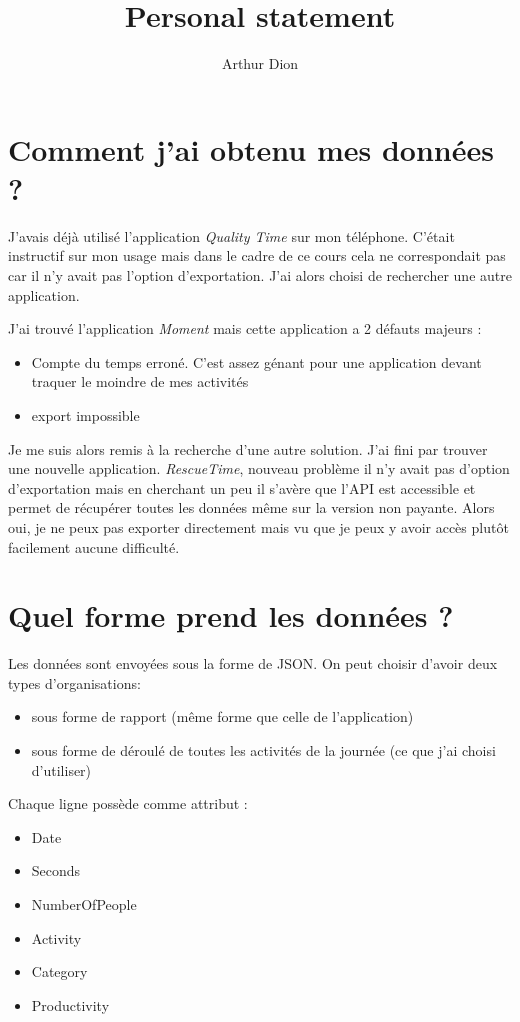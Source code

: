 \documentclass{article}
\begin{document}
\title{Personal statement}
\author{Arthur Dion}
\date{}
\maketitle


\section*{Comment  j'ai obtenu mes données ?}
 J'avais déjà utilisé l'application {\em Quality Time} sur mon téléphone. C'était instructif sur mon usage mais dans le cadre de ce cours cela ne correspondait pas car il n'y avait pas l'option d'exportation. J'ai alors choisi de rechercher une autre application.

J'ai trouvé l'application { \em Moment} mais cette application a 2 défauts majeurs : 
\begin{itemize}
\item Compte du temps erroné. C'est assez génant pour une application devant traquer le moindre de mes activités
\item export impossible
\end{itemize}


Je me suis alors remis à la recherche d'une autre solution. J'ai fini par trouver une nouvelle application. { \em RescueTime}, nouveau problème il n'y avait pas d'option d'exportation mais en cherchant un peu il s'avère que l'API est accessible et permet de récupérer toutes les données même sur la version non payante. Alors oui, je ne peux pas exporter directement
mais vu que je peux y avoir accès plutôt facilement aucune difficulté.



\section*{Quel forme prend les données ?}

Les données sont envoyées sous la forme de JSON. On peut choisir d'avoir deux types d'organisations:
\begin{itemize}
 \item sous forme de rapport (même forme que celle de l'application)
 \item sous forme de déroulé de toutes les activités de la journée (ce que j'ai choisi d'utiliser)
\end{itemize}


 Chaque ligne possède comme attribut : 
 \begin{itemize}
  \item  Date
 \item Seconds
 \item NumberOfPeople
 \item Activity
 \item Category
 \item Productivity
\end{itemize}  
\end{document}
